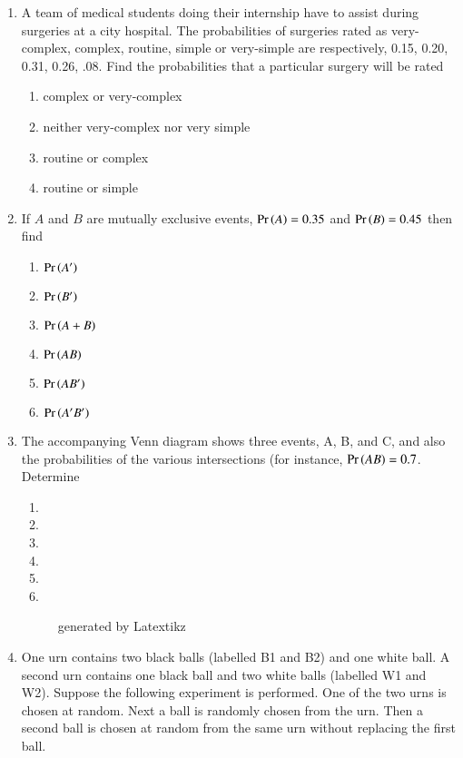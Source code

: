 \begin{enumerate}[label=\thesection.\arabic*,ref=\thesection.\theenumi]
	\item A team of medical students doing their internship have to assist during surgeries
at a city hospital. The probabilities of surgeries rated as very-complex, complex,
routine, simple or very-simple are respectively, 0.15, 0.20, 0.31, 0.26, .08. Find
the probabilities that a particular surgery will be rated
\begin{enumerate}
\item complex or very-complex
\item neither very-complex nor very simple
\item routine or complex
\item routine or simple
\end{enumerate}
		\solution
		
\item If $A$ and $B$ are mutually exclusive events, $\Pr\left(A\right)=0.35$ and $\Pr\left(B\right)=0.45$ then find
\begin{enumerate}
\item $\Pr\left(A'\right)$
\item $\Pr\left(B'\right)$
\item $\Pr\left(A+B\right)$
\item $\Pr\left(AB\right)$
\item $\Pr\left(AB'\right)$
\item $\Pr\left(A'B'\right)$
\end{enumerate}
%

%
\item The accompanying Venn diagram shows three events, A, B, and C, and also the probabilities of the various intersections (for instance, $\Pr\left(AB\right)=0.7$. Determine 
	\begin{enumerate}
		\item {}
		\item {}
		\item {}
		\item {}
		\item {}
		\item {}
	\end{enumerate}
	\begin{figure}[h!]
		\centering
		
		\caption {generated by Latextikz}
		\label{fig:exemplar/11/16/3/11}
	\end{figure}
		\solution
		
		\item One urn contains two black balls (labelled B1 and B2) and one white ball. A
		second urn contains one black ball and two white balls (labelled W1 and W2).
		Suppose the following experiment is performed. One of the two urns is chosen
		at random. Next a ball is randomly chosen from the urn. Then a second ball is
		chosen at random from the same urn without replacing the first ball.
		

\end{enumerate}

